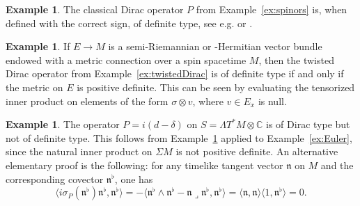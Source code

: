 \documentclass[a4paper,11pt]{amsart}
\theoremstyle{definition}
\newtheorem{ex}[thm]{Example}
\begin{document}
\begin{ex}\label{ex:spinDiractypdef}
The classical Dirac operator $P$ from Example~\ref{ex:spinors} is, when defined with the correct sign, of definite type, see e.g. \cite[Sec.~1.1.5]{Baum} or \cite[Sec.~2]{BGM}.
\end{ex}

\begin{ex}\label{ex:twistedDiracnotdef}
If $E\to M$ is a semi-Riemannian or -Hermitian vector bundle endowed with a metric connection over a spin spacetime $M$, then the twisted Dirac operator from Example~\ref{ex:twistedDirac} is of definite type if and only if the metric on $E$ is positive definite.
This can be seen by evaluating the tensorized inner product on elements of the form $\sigma\otimes v$, where $v\in E_x$ is null.
\end{ex}

\begin{ex}\label{ex:Eulerntypdef}
The operator $P=i(d-\delta)$ on $S=\Lambda T^*M\otimes {\mathbb{C}}$ is of Dirac type but not of definite type.
This follows from Example~\ref{ex:twistedDiracnotdef} applied to Example~\ref{ex:Euler}, since the natural inner product on $\Sigma M$ is not positive definite.
An alternative elementary proof is the following: for any timelike tangent vector $\mathfrak{n}$ on $M$ and the corresponding covector $\mathfrak{n}^\flat$, one has 
$$
{\langle} i\sigma_P(\mathfrak{n}^\flat)\mathfrak{n}^\flat,\mathfrak{n}^\flat{\rangle}
=
-{\langle}\mathfrak{n}^\flat\wedge\mathfrak{n}^\flat-\mathfrak{n}\lrcorner\mathfrak{n}^\flat,\mathfrak{n}^\flat{\rangle}
=
{\langle}\mathfrak{n},\mathfrak{n}{\rangle}{\langle}1,\mathfrak{n}^\flat{\rangle}
=
0.
$$
\end{ex}
\end{document}
